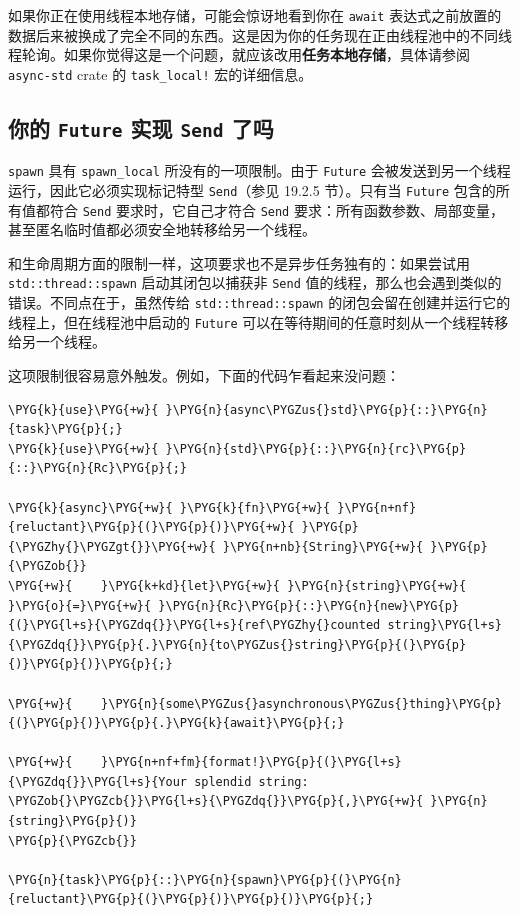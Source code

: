 如果你正在使用线程本地存储，可能会惊讶地看到你在 \texttt{await} 表达式之前放置的数据后来被换成了完全不同的东西。这是因为你的任务现在正由线程池中的不同线程轮询。如果你觉得这是一个问题，就应该改用\textbf{任务本地存储}，具体请参阅 \texttt{async-std} crate 的 \texttt{task\_local!} 宏的详细信息。

\subsection{你的 \texttt{Future} 实现 \texttt{Send} 了吗}

\texttt{spawn} 具有 \texttt{spawn\_local} 所没有的一项限制。由于 \texttt{Future} 会被发送到另一个线程运行，因此它必须实现标记特型 \texttt{Send}（参见 19.2.5 节）。只有当 \texttt{Future} 包含的所有值都符合 \texttt{Send} 要求时，它自己才符合 \texttt{Send} 要求：所有函数参数、局部变量，甚至匿名临时值都必须安全地转移给另一个线程。

和生命周期方面的限制一样，这项要求也不是异步任务独有的：如果尝试用 \texttt{std::thread::spawn} 启动其闭包以捕获非 \texttt{Send} 值的线程，那么也会遇到类似的错误。不同点在于，虽然传给 \texttt{std::thread::spawn} 的闭包会留在创建并运行它的线程上，但在线程池中启动的 \texttt{Future} 可以在等待期间的任意时刻从一个线程转移给另一个线程。

这项限制很容易意外触发。例如，下面的代码乍看起来没问题：

\begin{Verbatim}[commandchars=\\\{\},breaklines=true,breakanywhere=true,fontsize=\codefont,xleftmargin=17bp]
\PYG{k}{use}\PYG{+w}{ }\PYG{n}{async\PYGZus{}std}\PYG{p}{::}\PYG{n}{task}\PYG{p}{;}
\PYG{k}{use}\PYG{+w}{ }\PYG{n}{std}\PYG{p}{::}\PYG{n}{rc}\PYG{p}{::}\PYG{n}{Rc}\PYG{p}{;}

\PYG{k}{async}\PYG{+w}{ }\PYG{k}{fn}\PYG{+w}{ }\PYG{n+nf}{reluctant}\PYG{p}{(}\PYG{p}{)}\PYG{+w}{ }\PYG{p}{\PYGZhy{}\PYGZgt{}}\PYG{+w}{ }\PYG{n+nb}{String}\PYG{+w}{ }\PYG{p}{\PYGZob{}}
\PYG{+w}{    }\PYG{k+kd}{let}\PYG{+w}{ }\PYG{n}{string}\PYG{+w}{ }\PYG{o}{=}\PYG{+w}{ }\PYG{n}{Rc}\PYG{p}{::}\PYG{n}{new}\PYG{p}{(}\PYG{l+s}{\PYGZdq{}}\PYG{l+s}{ref\PYGZhy{}counted string}\PYG{l+s}{\PYGZdq{}}\PYG{p}{.}\PYG{n}{to\PYGZus{}string}\PYG{p}{(}\PYG{p}{)}\PYG{p}{)}\PYG{p}{;}

\PYG{+w}{    }\PYG{n}{some\PYGZus{}asynchronous\PYGZus{}thing}\PYG{p}{(}\PYG{p}{)}\PYG{p}{.}\PYG{k}{await}\PYG{p}{;}

\PYG{+w}{    }\PYG{n+nf+fm}{format!}\PYG{p}{(}\PYG{l+s}{\PYGZdq{}}\PYG{l+s}{Your splendid string: \PYGZob{}\PYGZcb{}}\PYG{l+s}{\PYGZdq{}}\PYG{p}{,}\PYG{+w}{ }\PYG{n}{string}\PYG{p}{)}
\PYG{p}{\PYGZcb{}}

\PYG{n}{task}\PYG{p}{::}\PYG{n}{spawn}\PYG{p}{(}\PYG{n}{reluctant}\PYG{p}{(}\PYG{p}{)}\PYG{p}{)}\PYG{p}{;}
\end{Verbatim}

